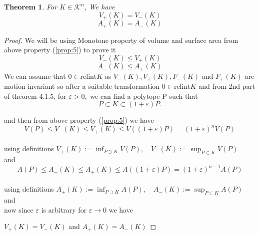 \documentclass[oneside]{book}
\newtheorem{theorem}{Theorem}[section]
\begin{document}
	\begin{theorem}     
		\label{t:9}
		For $K \in \mathcal{K}^{n}$, We have 
		\begin{equation}
			\label{eq46}
			V_{+}(K)=V_{-}(K)
		\end{equation}
		\begin{equation}
			\label{eq47}
			A_{+}(K)=A_{-}(K)
		\end{equation}
	\end{theorem}         
	\begin{proof}
		We will be using Monotone property of volume and surface area from above property (\ref{prop:5}) to prove it \\
		$$V_{-}(K) \leq V_{+}(K)  $$  $$ A_{-}(K) \leq A_{+}(K)$$
		We can assume that $0 \in \text{relint} K$ as  $V_{-}(K), V_{+}(K), F_{-}(K)$ and $F_{+}(K)$ are \newline motion invariant so after a suitable transformation
		$0 \in \text{relint} K$ 
		and from 2nd part of theorem 4.1.5,
		for $\varepsilon>0,$ we can find a polytope P such that 
		$$P \subset K \subset(1+\varepsilon) P .$$
		
		and then from above property (\ref{prop:5}) we have \\ 
		\[
		V(P) \leq V_{-}(K) \leq V_{+}(K) \leq V((1+\varepsilon) P)=(1+\varepsilon)^{n} V(P)
		\] \\
		using definitions $ V_{+}(K):=\inf _{P \supset K} V(P), \quad V_{-}(K):=\sup _{P \subset K} V(P)$ \\
		and   \\
		\[
		A(P) \leq A_{-}(K) \leq A_{+}(K) \leq A((1+\varepsilon) P)=(1+\varepsilon)^{n-1} A(P)
		\]  \\using definitions 
		$ A_{+}(K):=\inf _{P \supset K} A(P), \quad A_{-}(K):=\sup _{P \subset K} A(P) $
		and \\ 
		
		now since $\varepsilon $ is arbitrary for $\varepsilon \rightarrow 0$ we have 
		
		$V_{+}(K)=V_{-}(K)$ and  $A_{+}(K)=A_{-}(K)$
	\end{proof}
	
\end{document}
